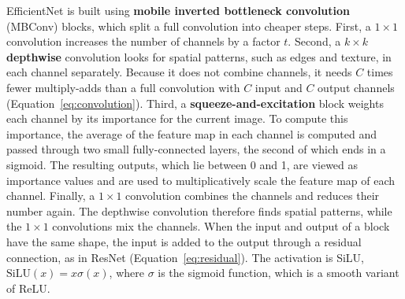 EfficientNet \citep{tan2019efficientnet} is built using \textbf{mobile inverted bottleneck convolution} (MBConv) blocks, which split a full convolution into cheaper steps. First, a $1\times1$ convolution increases the number of channels by a factor $t$. Second, a $k\times k$ \textbf{depthwise} convolution looks for spatial patterns, such as edges and texture, in each channel separately. Because it does not combine channels, it needs $C$ times fewer multiply-adds than a full convolution with $C$ input and $C$ output channels (Equation~\ref{eq:convolution}). Third, a \textbf{squeeze-and-excitation} block \citep{hu2018squeeze} weights each channel by its importance for the current image. To compute this importance, the average of the feature map in each channel is computed and passed through two small fully-connected layers, the second of which ends in a sigmoid. The resulting outputs, which lie between 0 and 1, are viewed as importance values and are used to multiplicatively scale the feature map of each channel. Finally, a $1\times1$ convolution combines the channels and reduces their number again. The depthwise convolution therefore finds spatial patterns, while the $1\times1$ convolutions mix the channels. When the input and output of a block have the same shape, the input is added to the output through a residual connection, as in ResNet (Equation~\ref{eq:residual}). The activation is SiLU, $\mathrm{SiLU}(x) = x\sigma(x)$, where $\sigma$ is the sigmoid function, which is a smooth variant of ReLU.

